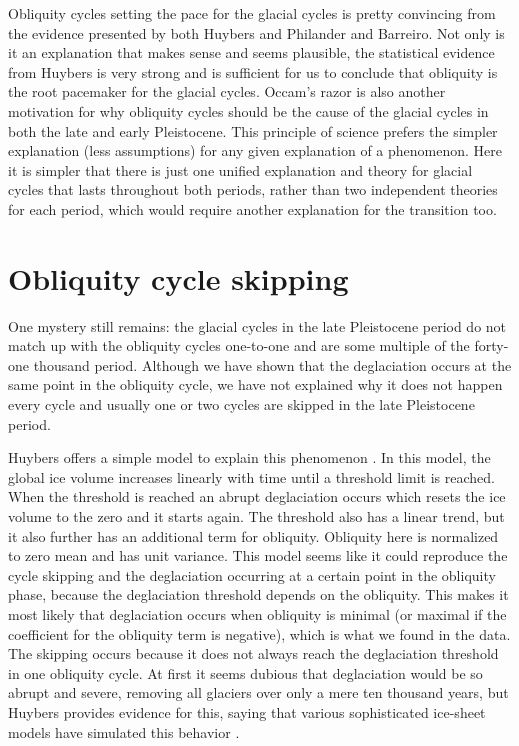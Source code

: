 \documentclass[11pt]{article}
\begin{document}
Obliquity cycles setting the pace for the glacial cycles is pretty convincing from the evidence presented by both Huybers and Philander and Barreiro.
Not only is it an explanation that makes sense and seems plausible, the statistical evidence from Huybers is very strong and is sufficient for us to conclude that obliquity is the root pacemaker for the glacial cycles.
Occam's razor is also another motivation for why obliquity cycles should be the cause of the glacial cycles in both the late and early Pleistocene.
This principle of science prefers the simpler explanation (less assumptions) for any given explanation of a phenomenon.
Here it is simpler that there is just one unified explanation and theory for glacial cycles that lasts throughout both periods, rather than two independent theories for each period, which would require another explanation for the transition too.

\section{Obliquity cycle skipping}
One mystery still remains: the glacial cycles in the late Pleistocene period do not match up with the obliquity cycles one-to-one and are some multiple of the forty-one thousand period.
Although we have shown that the deglaciation occurs at the same point in the obliquity cycle, we have not explained why it does not happen every cycle and usually one or two cycles are skipped in the late Pleistocene period.

Huybers offers a simple model to explain this phenomenon \cite{huybers}.
In this model, the global ice volume increases linearly with time until a threshold limit is reached.
When the threshold is reached an abrupt deglaciation occurs which resets the ice volume to the zero and it starts again.
The threshold also has a linear trend, but it also further has an additional term for obliquity.
Obliquity here is normalized to zero mean and has unit variance.
This model seems like it could reproduce the cycle skipping and the deglaciation occurring at a certain point in the obliquity phase, because the deglaciation threshold depends on the obliquity.
This makes it most likely that deglaciation occurs when obliquity is minimal (or maximal if the coefficient for the obliquity term is negative), which is what we found in the data.
The skipping occurs because it does not always reach the deglaciation threshold in one obliquity cycle.
At first it seems dubious that deglaciation would be so abrupt and severe, removing all glaciers over only a mere ten thousand years, but Huybers provides evidence for this, saying that various sophisticated ice-sheet models have simulated this behavior \cite{huybers}.
\end{document}
